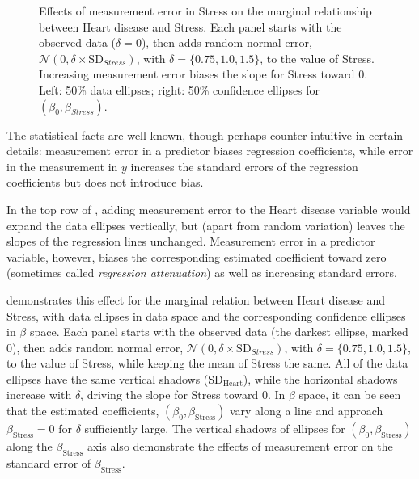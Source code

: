 \begin{figure}[htb]
\begin{minipage}[b]{.49\linewidth}
 \end{minipage}
  \caption{Effects of measurement error in Stress on the marginal relationship between Heart disease and Stress.
  Each panel starts with the observed data ($\delta=0$), then adds random normal error,
  $\mathcal{N}(0, \delta \times \mathrm{SD}_{Stress})$, with $\delta = \{0.75, 1.0, 1.5\}$, to the value of Stress.
  Increasing measurement error biases the slope for Stress toward 0.
  Left: 50\% data ellipses; right: 50\% confidence ellipses for $(\beta_0, \beta_{Stress})$. }
  \label{fig:coffee-stress}
\end{figure}

The statistical facts are well known, though perhaps counter-intuitive in certain details:
measurement error in a predictor biases regression coefficients, while
error in the measurement in  $y$
increases the standard errors of the regression coefficients but does not introduce
bias.

In the top row of
, adding measurement error to the Heart disease variable
would expand the data ellipses vertically, but 
(apart from random variation)
leaves the slopes of the regression lines unchanged.
Measurement error in a predictor variable, however, biases the corresponding
estimated coefficient toward
zero (sometimes called \emph{regression attenuation}) as well as increasing standard errors.
                                         
 demonstrates this effect for the marginal
relation between Heart disease and Stress,
with data ellipses in data space and the corresponding confidence ellipses in $\beta$ space.
Each panel starts with the observed data (the darkest ellipse, marked $0$), then adds random normal error,
$\mathcal{N}(0, \delta \times \mathrm{SD}_{Stress})$, with $\delta = \{0.75, 1.0, 1.5\}$, to the value of Stress,
while keeping the mean of Stress the same.
All of the data ellipses have the same vertical shadows ($\mathrm{SD}_{\textrm{Heart}}$), while the horizontal shadows
increase with $\delta$, driving the slope for Stress toward 0.
In $\beta$ space, it can be seen that the estimated coefficients, $(\beta_0, \beta_{\textrm{Stress}})$
vary along a line and approach $\beta_{\textrm{Stress}}=0$ for $\delta$ sufficiently large.
The vertical shadows of
ellipses for $(\beta_0, \beta_{\textrm{Stress}})$ along the $\beta_{\textrm{Stress}}$ axis
also demonstrate the effects of measurement error
on the standard error of $\beta_{\textrm{Stress}}$.

